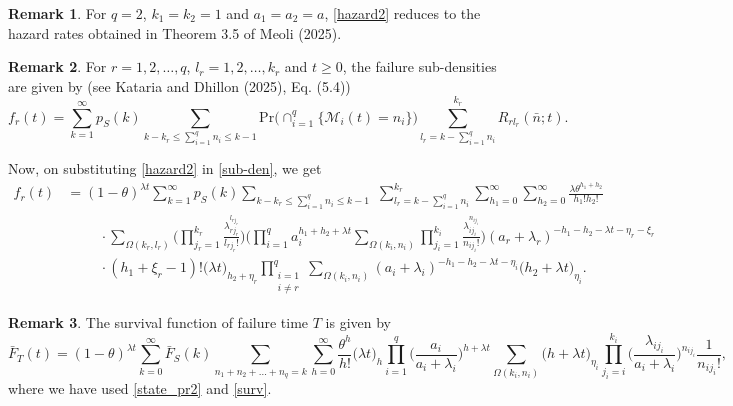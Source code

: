 \documentclass[12pt,oneside,reqno]{amsart}
\numberwithin{equation}{section}
\theoremstyle{definition}
\numberwithin{equation}{section}
\newtheorem{remark}{\bf Remark}[section]
\theoremstyle{remarkstyle}
\begin{document}
\begin{remark}
For $q=2$, $k_1=k_2=1$ and $a_1=a_2=a$, \eqref{hazard2} reduces to the hazard rates obtained in Theorem 3.5 of Meoli (2025).
\end{remark}





	\begin{remark}
		For $r=1,2,\dots,q$, $l_r=1,2,\dots,k_r$ and $t\ge 0$, the failure sub-densities are given by (see Kataria and Dhillon (2025), Eq. (5.4))
\begin{equation}\label{sub-den}
f_r(t)=\sum_{k=1}^{\infty}p_S(k)\sum_{k-k_r\leq\sum_{i=1}^{q}n_i\leq k-1}\mathrm{Pr}\Big(\cap_{i=1}^{q}\{\mathscr{M}_i(t)=n_i\}\big)\sum_{l_r=k-\sum_{i=1}^{q}n_i}^{k_r}R_{rl_r}(\bar{n};t).
\end{equation}
		
Now, on substituting \eqref{hazard2} in \eqref{sub-den}, we get
		{\footnotesize \begin{align*}
			f_r(t)&=(1-\theta)^{\lambda t}\sum_{k=1}^{\infty}p_S(k)\sum_{k-k_r\leq\sum_{i=1}^{q}n_i\leq k-1}\,\,\sum_{l_r=k-\sum_{i=1}^{q}n_i}^{k_r}
				\sum_{h_1=0}^{\infty}\sum_{h_2=0}^{\infty}
				\frac{\lambda \theta^{h_1+h_2}}{h_1!h_2!}\\
				&\hspace{1cm} \cdot\sum_{\Omega(k_r,l_r)}\Big(\prod_{j_r=1}^{k_r}\frac{\lambda_{rj_r}^{l_{rj_r}}}{l_{rj_r}!}\Big)
				\Big(\prod_{i=1}^{q}a_i^{h_1+h_2+\lambda t}\sum_{\Omega(k_i,n_i)}\prod_{j_i=1}^{k_i}\frac{\lambda_{ij_i}^{n_{ij_i}}}{n_{ij_i}!}\Big)(a_r+\lambda_r)^{-h_1-h_2-\lambda t-\eta_r-\xi_r}\nonumber\\ 
				&\hspace{1cm} \cdot(h_1+\xi_r-1)!\big(\lambda t\big)_{h_2+\eta_r}
				\prod_{\substack{i=1\\i\neq r}}^{q}\sum_{\Omega(k_i,n_i)}(a_i+\lambda_i)^{-h_1-h_2-\lambda t-\eta_i}\big(h_2+\lambda t\big)_{\eta_i}.
			\end{align*}}
	\end{remark}
	
	\begin{remark}
The survival function of failure time $T$ is given by
{\scriptsize		\begin{equation}\label{surv2}
\bar{F}_T(t)=(1-\theta)^{\lambda t}\sum_{k=0}^{\infty}\bar{F}_S(k)\sum_{n_1+n_2+\dots+n_q=k}\sum_{h=0}^{\infty}\frac{\theta^h}{h!}\big(\lambda t\big)_h \prod_{i=1}^{q}\Big(\frac{a_i}{a_i+\lambda_i}\Big)^{h+\lambda t}\sum_{\Omega(k_i,n_i)}\big(h+\lambda t\big)_{\eta_i}\prod_{j_i=i}^{k_i}\Big(\frac{\lambda_{ij_i}}{a_i+\lambda_i}\Big)^{n_{ij_i}}				
\frac{1}{n_{ij_i}!},
		\end{equation}}
where we have used \eqref{state_pr2} and \eqref{surv}.
\end{remark}
	
\end{document}
